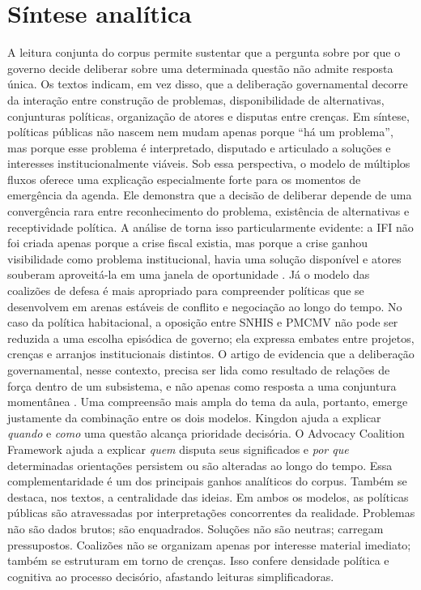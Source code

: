 \documentclass[12pt,a4paper]{article}
\begin{document}
\section{Síntese analítica}
\label{sec:orgd479daa}
A leitura conjunta do corpus permite sustentar que a pergunta sobre por que o governo decide deliberar sobre uma determinada questão não admite resposta única. Os textos indicam, em vez disso, que a deliberação governamental decorre da interação entre construção de problemas, disponibilidade de alternativas, conjunturas políticas, organização de atores e disputas entre crenças. Em síntese, políticas públicas não nascem nem mudam apenas porque “há um problema”, mas porque esse problema é interpretado, disputado e articulado a soluções e interesses institucionalmente viáveis.
Sob essa perspectiva, o modelo de múltiplos fluxos oferece uma explicação especialmente forte para os momentos de emergência da agenda. Ele demonstra que a decisão de deliberar depende de uma convergência rara entre reconhecimento do problema, existência de alternativas e receptividade política. A análise de \textcite{bijos2024ifi} torna isso particularmente evidente: a IFI não foi criada apenas porque a crise fiscal existia, mas porque a crise ganhou visibilidade como problema institucional, havia uma solução disponível e atores souberam aproveitá-la em uma janela de oportunidade \autocites{bijos2024ifi}{capella2022multiplos}.
Já o modelo das coalizões de defesa é mais apropriado para compreender políticas que se desenvolvem em arenas estáveis de conflito e negociação ao longo do tempo. No caso da política habitacional, a oposição entre SNHIS e PMCMV não pode ser reduzida a uma escolha episódica de governo; ela expressa embates entre projetos, crenças e arranjos institucionais distintos. O artigo de \textcite{ferreira2019habitacional} evidencia que a deliberação governamental, nesse contexto, precisa ser lida como resultado de relações de força dentro de um subsistema, e não apenas como resposta a uma conjuntura momentânea \autocites{ferreira2019habitacional}{araujoSilva2022coalizoes}.
Uma compreensão mais ampla do tema da aula, portanto, emerge justamente da combinação entre os dois modelos. Kingdon ajuda a explicar \emph{quando} e \emph{como} uma questão alcança prioridade decisória. O Advocacy Coalition Framework ajuda a explicar \emph{quem} disputa seus significados e \emph{por que} determinadas orientações persistem ou são alteradas ao longo do tempo. Essa complementaridade é um dos principais ganhos analíticos do corpus.
Também se destaca, nos textos, a centralidade das ideias. Em ambos os modelos, as políticas públicas são atravessadas por interpretações concorrentes da realidade. Problemas não são dados brutos; são enquadrados. Soluções não são neutras; carregam pressupostos. Coalizões não se organizam apenas por interesse material imediato; também se estruturam em torno de crenças. Isso confere densidade política e cognitiva ao processo decisório, afastando leituras simplificadoras.
\end{document}
